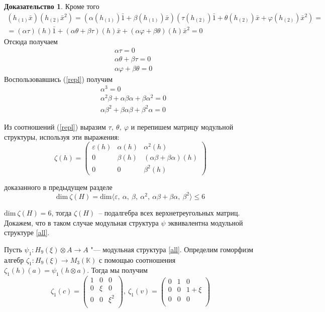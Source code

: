 \documentclass[a4paper, 12pt]{article}
\theoremstyle{definition}
\newtheorem*{prof}{\hspace*{\parindent}Доказательство}
\begin{document}
\begin{prof}
    \noindent Кроме того
    \begin{multline*}
        (h_{(1)}\bar{x})(h_{(2)}\bar{x}^2) = 
        \left( \alpha(h_{(1)}) \bar{1} + \beta(h_{(1)}) \bar{x} \right)
        \left( \tau(h_{(2)}) \bar{1} + \theta(h_{(2)}) \bar{x} + \varphi(h_{(2)}) \bar{x}^2 \right)=
        \\
        = (\alpha\tau)(h) \bar{1}
        +(\alpha\theta + \beta\tau)(h)\bar{x}+(\alpha\varphi + \beta\theta)(h)\bar{x}^2
        =0
    \end{multline*}
    Отсюда получаем
    \begin{align*}
        &\alpha \tau = 0\\
        &\alpha \theta + \beta \tau = 0\\
        &\alpha \varphi + \beta \theta = 0
    \end{align*}
    Воспользовавшись (\ref{repl}) получим
    \begin{align}
        &\alpha^3 = 0 \label{1}\\
        &\alpha^2\beta+\alpha\beta\alpha + \beta\alpha^2 = 0 \label{2}\\
        &\alpha\beta^2+\beta\alpha\beta+\beta^2\alpha = 0 \label{3}
    \end{align}
    
    Из соотношений (\ref{repl}) выразим $\tau,\ \theta,\ \varphi$ и перепишем матрицу модульной структуры, используя эти выражения:
    \[\zeta(h) = 
    \begin{pmatrix}
        \varepsilon(h) & \alpha(h) & \alpha^2(h)\\
         0 & \beta(h) & (\alpha\beta + \beta\alpha)(h) \\
         0 & 0 & \beta^2(h)
    \end{pmatrix}\]

     доказанного в предыдущем разделе \[\mathrm{dim} \ \zeta(H) = \mathrm{dim} \langle\varepsilon,\ \alpha,\ \beta,\ \alpha^2,\ \alpha\beta+\beta\alpha,\ \beta^2 \rangle \leq 6\]

     $\mathrm{dim}\ \zeta(H) = 6$, тогда $\zeta(H)$~-- подалгебра всех верхнетреугольных матриц. Докажем, что в таком случае модульная структура $\psi$ эквивалентна модульной структуре \ref{all}.

    Пусть $\psi_1:H_9(\xi) \otimes A \to A$ "--- модульная структура \ref{all}.
    Определим гоморфизм алгебр $\zeta_1:H_9(\xi) \to M_3(\mathbb{K})$ с помощью соотношения ${\zeta_1(h)(a)=\psi_1(h \otimes a)}$.
    Тогда мы получим \[
    \zeta_1(c) = 
    \begin{pmatrix}
        1 & 0 & 0\\
        0 & \xi & 0\\
        0 & 0 & \xi^2\\
    \end{pmatrix},\ 
    \zeta_1(v) = 
    \begin{pmatrix}
        0 & 1 & 0\\
        0 & 0 & 1+\xi\\
        0 & 0 & 0\\
    \end{pmatrix}
    \]


\end{prof}
\end{document}
